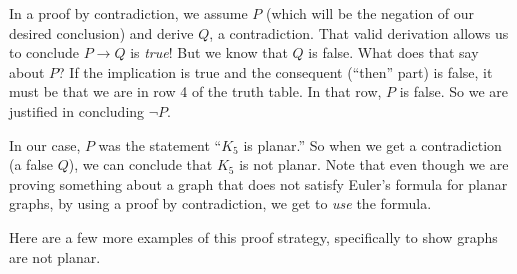 \documentclass[10pt,]{book}
\theoremstyle{plain}
\theoremstyle{definition}
\theoremstyle{definition}
\theoremstyle{definition}
\numberwithin{equation}{chapter}
\def\imp{\rightarrow}
\begin{document}
\par
\hypertarget{p-275}{}%
In a proof by contradiction, we assume \(P\) (which will be the negation of our desired conclusion) and derive \(Q\), a contradiction.  That valid derivation allows us to conclude \(P \imp Q\) is \emph{true}!  But we know that \(Q\) is false.  What does that say about \(P\)?  If the implication is true and the consequent (``then'' part) is false, it must be that we are in row 4 of the truth table.  In that row, \(P\) is false.  So we are justified in concluding \(\neg P\).%
\par
\hypertarget{p-276}{}%
In our case, \(P\) was the statement ``\(K_5\) is planar.''  So when we get a contradiction (a false \(Q\)), we can conclude that \(K_5\) is not planar.  Note that even though we are proving something about a graph that does not satisfy Euler's formula for planar graphs, by using a proof by contradiction, we get to \emph{use} the formula.%
\par
\hypertarget{p-277}{}%
Here are a few more examples of this proof strategy, specifically to show graphs are not planar.%
\end{document}
